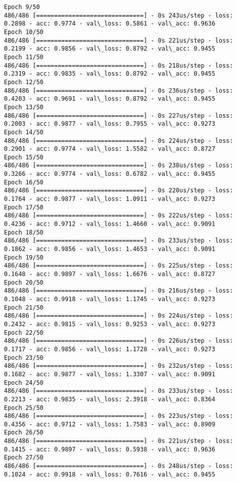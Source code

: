\documentclass[11pt]{article}
\begin{document}
\begin{Verbatim}[commandchars=\\\{\}]
Epoch 9/50
486/486 [==============================] - 0s 243us/step - loss: 0.2898 - acc: 0.9774 - val\_loss: 0.5861 - val\_acc: 0.9636
Epoch 10/50
486/486 [==============================] - 0s 221us/step - loss: 0.2199 - acc: 0.9856 - val\_loss: 0.8792 - val\_acc: 0.9455
Epoch 11/50
486/486 [==============================] - 0s 218us/step - loss: 0.2319 - acc: 0.9835 - val\_loss: 0.8792 - val\_acc: 0.9455
Epoch 12/50
486/486 [==============================] - 0s 236us/step - loss: 0.4203 - acc: 0.9691 - val\_loss: 0.8792 - val\_acc: 0.9455
Epoch 13/50
486/486 [==============================] - 0s 227us/step - loss: 0.2003 - acc: 0.9877 - val\_loss: 0.7955 - val\_acc: 0.9273
Epoch 14/50
486/486 [==============================] - 0s 224us/step - loss: 0.2901 - acc: 0.9774 - val\_loss: 1.5582 - val\_acc: 0.8727
Epoch 15/50
486/486 [==============================] - 0s 238us/step - loss: 0.3266 - acc: 0.9774 - val\_loss: 0.6782 - val\_acc: 0.9455
Epoch 16/50
486/486 [==============================] - 0s 220us/step - loss: 0.1764 - acc: 0.9877 - val\_loss: 1.0911 - val\_acc: 0.9273
Epoch 17/50
486/486 [==============================] - 0s 222us/step - loss: 0.4236 - acc: 0.9712 - val\_loss: 1.4660 - val\_acc: 0.9091
Epoch 18/50
486/486 [==============================] - 0s 233us/step - loss: 0.1862 - acc: 0.9856 - val\_loss: 1.4653 - val\_acc: 0.9091
Epoch 19/50
486/486 [==============================] - 0s 225us/step - loss: 0.1648 - acc: 0.9897 - val\_loss: 1.6676 - val\_acc: 0.8727
Epoch 20/50
486/486 [==============================] - 0s 216us/step - loss: 0.1048 - acc: 0.9918 - val\_loss: 1.1745 - val\_acc: 0.9273
Epoch 21/50
486/486 [==============================] - 0s 224us/step - loss: 0.2432 - acc: 0.9815 - val\_loss: 0.9253 - val\_acc: 0.9273
Epoch 22/50
486/486 [==============================] - 0s 226us/step - loss: 0.1717 - acc: 0.9856 - val\_loss: 1.1728 - val\_acc: 0.9273
Epoch 23/50
486/486 [==============================] - 0s 232us/step - loss: 0.1682 - acc: 0.9877 - val\_loss: 1.3307 - val\_acc: 0.9091
Epoch 24/50
486/486 [==============================] - 0s 233us/step - loss: 0.2213 - acc: 0.9835 - val\_loss: 2.3918 - val\_acc: 0.8364
Epoch 25/50
486/486 [==============================] - 0s 223us/step - loss: 0.4356 - acc: 0.9712 - val\_loss: 1.7583 - val\_acc: 0.8909
Epoch 26/50
486/486 [==============================] - 0s 221us/step - loss: 0.1415 - acc: 0.9897 - val\_loss: 0.5938 - val\_acc: 0.9636
Epoch 27/50
486/486 [==============================] - 0s 248us/step - loss: 0.1024 - acc: 0.9918 - val\_loss: 0.7616 - val\_acc: 0.9455

\end{Verbatim}
\end{document}
